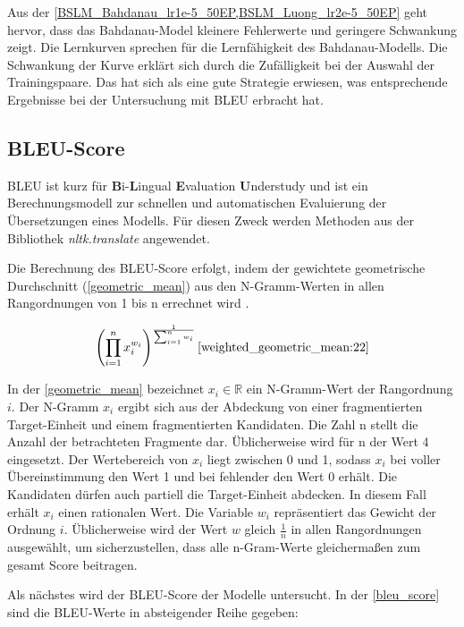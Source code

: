 Aus der \cref{BSLM_Bahdanau_lr1e-5_50EP,BSLM_Luong_lr2e-5_50EP} geht hervor, dass das Bahdanau-Model kleinere Fehlerwerte und geringere Schwankung zeigt. Die Lernkurven sprechen für die Lernfähigkeit des Bahdanau-Modells. Die Schwankung der Kurve erklärt sich durch die Zufälligkeit bei der Auswahl der Trainingspaare. Das hat sich als eine gute Strategie erwiesen, was entsprechende Ergebnisse bei der Untersuchung mit BLEU erbracht hat.

\subsection{BLEU-Score}

BLEU ist kurz für \textbf{B}i-\textbf{L}ingual \textbf{E}valuation \textbf{U}nderstudy und ist ein Berechnungsmodell zur schnellen und automatischen Evaluierung der Übersetzungen eines Modells. Für diesen Zweck werden Methoden aus der Bibliothek \textit{nltk.translate} angewendet. 

Die Berechnung des BLEU-Score erfolgt, indem der gewichtete geometrische Durchschnitt (\cref{geometric_mean}) aus den N-Gramm-Werten in allen Rangordnungen von 1 bis n errechnet wird \cite{BLEU:17}.

\begin{equation}\label{geometric_mean}
	\left(\prod_{i=1}^{n} x_i^{w_i}\right)^{\frac{1}{\sum_{i=1}^{n} w_i}} \cite{weighted_geometric_mean:22}
\end{equation} 

In der \cref{geometric_mean} bezeichnet $x_i \in \mathbb{R}$ ein N-Gramm-Wert der Rangordnung $i$. Der N-Gramm $x_i$ ergibt sich aus der Abdeckung von einer fragmentierten Target-Einheit und einem fragmentierten Kandidaten. Die Zahl n stellt die Anzahl der betrachteten Fragmente dar. Üblicherweise wird für n der Wert 4 eingesetzt. Der Wertebereich von $x_i$ liegt zwischen 0 und 1, sodass $x_i$ bei voller Übereinstimmung den Wert 1 und bei fehlender den Wert 0 erhält. Die Kandidaten dürfen auch partiell die Target-Einheit abdecken. In diesem Fall erhält $x_i$ einen rationalen Wert. Die Variable $w_i$ repräsentiert das Gewicht der Ordnung $i$. Üblicherweise wird der Wert $w$ gleich $\frac{1}{n}$ in allen Rangordnungen ausgewählt, um sicherzustellen, dass alle n-Gram-Werte gleichermaßen zum gesamt Score beitragen.

Als nächstes wird der BLEU-Score der Modelle untersucht. In der \cref{bleu_score} sind die BLEU-Werte in absteigender Reihe gegeben:

